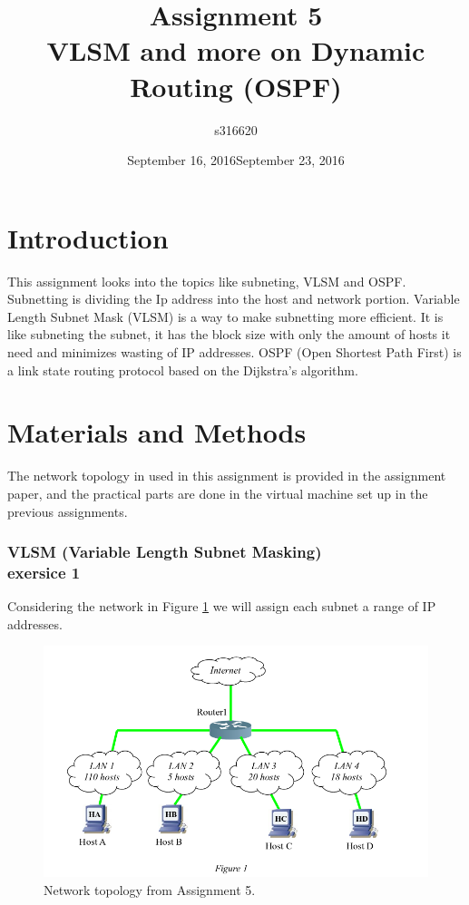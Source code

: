 \documentclass{article}
\date{September 16, 2016}
\title{\textbf{Assignment 5}\\ VLSM and more on Dynamic Routing (OSPF)}
\author{s316620}
\date{September 23, 2016}
\begin{document}
\maketitle

\newpage

\tableofcontents

\newpage
\part{Introduction}

This assignment looks into the topics like subneting, VLSM and OSPF. Subnetting is dividing the Ip address into the host and network portion. Variable Length  Subnet Mask (VLSM) is a way to make subnetting more efficient. It is like subneting the subnet, it has the block size with only the amount of hosts it need and minimizes wasting of IP addresses.
OSPF (Open Shortest Path First) is a link state routing protocol based on the Dijkstra's algorithm. \cite{textbook} 

\part{Materials and Methods}

The network topology in used in this assignment is provided in the assignment paper, and the practical parts are done in the virtual machine set up in the previous assignments.

\section{VLSM (Variable Length Subnet Masking)\\ exersice 1}
Considering the network in Figure \ref{fig:network-one} we will assign each subnet a range of IP addresses. 

\begin{figure}[!h]
    \centering
    \includegraphics[scale=0.3]{5-network-one}
    \caption{Network topology from Assignment 5.}
    \label{fig:network-one}
\end{figure}
\end{document}
